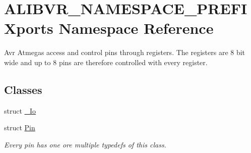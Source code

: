 \hypertarget{namespaceALIBVR__NAMESPACE__PREFIXports}{}\section{A\+L\+I\+B\+V\+R\+\_\+\+N\+A\+M\+E\+S\+P\+A\+C\+E\+\_\+\+P\+R\+E\+F\+I\+Xports Namespace Reference}
\label{namespaceALIBVR__NAMESPACE__PREFIXports}


Avr Atmegas access and control pins through registers. The registers are 8 bit wide and up to 8 pins are therefore controlled with every register.  


\subsection*{Classes}
\begin{DoxyCompactItemize}
\item 
struct \hyperlink{structALIBVR__NAMESPACE__PREFIXports_1_1__Io}{\+\_\+\+Io}
\item 
struct \hyperlink{structALIBVR__NAMESPACE__PREFIXports_1_1Pin}{Pin}
\begin{DoxyCompactList}\small\item\em Every pin has one ore multiple typedefs of this class. \end{DoxyCompactList}\end{DoxyCompactItemize}
